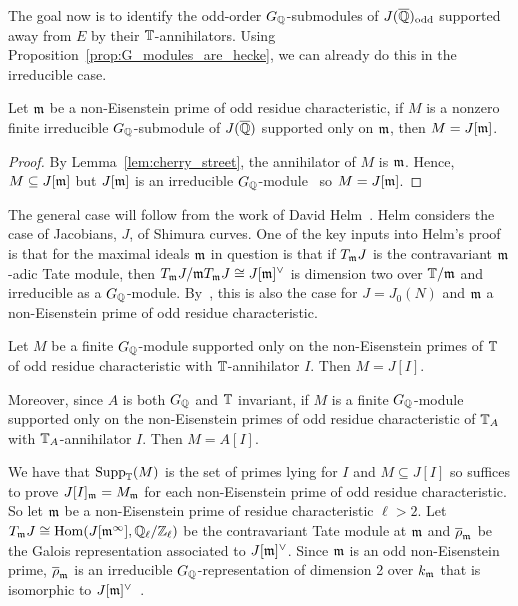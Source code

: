 The goal now is to identify the odd-order $G_{\mathbb{Q}}$-submodules of
$J(\overline{\mathbb{Q}})_{\mathrm{odd}}$ supported away from $E$ by their $\mathbb{T}$-annihilators. Using
Proposition~\ref{prop:G_modules_are_hecke}, we can already do this in the
irreducible case.
\begin{corollary}
    Let $\mathfrak{m}$ be a non-Eisenstein prime of odd residue characteristic, if $M$ is
    a nonzero finite irreducible $G_{\mathbb{Q}}$-submodule of $J(\overline{\mathbb{Q}})$ supported
    only on $\mathfrak{m}$, then $M=J[\mathfrak{m}]$.
\end{corollary}
\begin{proof}
    By Lemma~\ref{lem:cherry_street}, the annihilator of $M$ is $\mathfrak{m}$. Hence,
    $M\subseteq J[\mathfrak{m}]$ but $J[\mathfrak{m}]$ is an irreducible
    $G_{\mathbb{Q}}$-module~\cite[Proposition 14.2]{mazur:eisenstein} so $M=J[\mathfrak{m}]$.
\end{proof}

The general case will follow from the work of David Helm~\cite{helm:jacobian}.
Helm considers the case of Jacobians, $J$, of Shimura curves. One of the key
inputs into Helm's proof is that for the maximal ideals $\mathfrak{m}$ in question is
that if $T_{\mathfrak{m}} J$ is the contravariant $\mathfrak{m}$-adic Tate module, then $T_{\mathfrak{m}} J/\mathfrak{m}
T_{\mathfrak{m}} J\cong J[\mathfrak{m}]^\vee$ is dimension two over $\mathbb{T}/\mathfrak{m}$ and irreducible as a
$G_{\mathbb{Q}}$-module. By~\cite[Prop. 14.2]{mazur:eisenstein}, this is also the case
for $J=J_0(N)$ and $\mathfrak{m}$ a non-Eisenstein prime of odd residue characteristic.

\begin{theorem}%
    \label{thm:non_eisenstein_kernel_hecke}
    Let $M$ be a finite $G_{\mathbb{Q}}$-module supported only on the non-Eisenstein
    primes of $\mathbb{T}$ of odd residue characteristic with $\mathbb{T}$-annihilator $I$.
    Then $M=J[I]$.

    Moreover, since $A$ is both $G_{\mathbb{Q}}$ and $\mathbb{T}$ invariant, if $M$ is a finite
    $G_{\mathbb{Q}}$-module supported only on the non-Eisenstein primes of odd residue
    characteristic of $\mathbb{T}_A$ with $\mathbb{T}_A$-annihilator $I$. Then $M=A[I]$.
\end{theorem}

We have that $\operatorname{Supp}_{\mathbb{T}}(M)$ is the set of primes lying for $I$ and $M\subseteq
J[I]$ so suffices to prove $J[I]_{\mathfrak{m}} = M_{\mathfrak{m}}$ for each non-Eisenstein prime of
odd residue characteristic. So let $\mathfrak{m}$ be a non-Eisenstein prime of residue
characteristic $\ell>2$. Let $T_{\mathfrak{m}} J\cong \operatorname{Hom}(J[\mathfrak{m}^\infty],
\mathbb{Q}_\ell/\mathbb{Z}_\ell)$ be the contravariant Tate module at $\mathfrak{m}$ and
$\overline{\rho}_{\mathfrak{m}}$ be the Galois representation associated to $J[\mathfrak{m}]^\vee$.
Since $\mathfrak{m}$ is an odd non-Eisenstein prime, $\overline{\rho}_{\mathfrak{m}}$ is an
irreducible $G_{\mathbb{Q}}$-representation of dimension 2 over $k_{\mathfrak{m}}$ that is
isomorphic to $J[\mathfrak{m}]^\vee$~\cite[Prop. 14.2]{mazur:eisenstein}.

